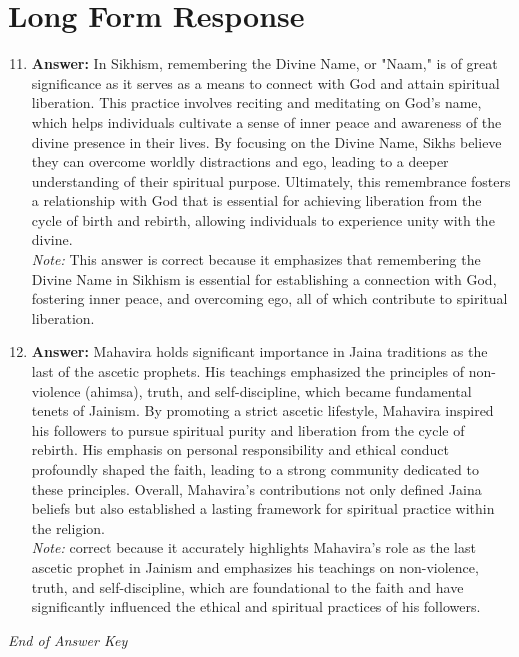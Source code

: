 \documentclass[12pt]{article}
\begin{document}
\section*{Long Form Response}
\begin{enumerate}[label=\arabic*.]
\setcounter{enumi}{10}
\item \textbf{Answer:} In Sikhism, remembering the Divine Name, or "Naam," is of great significance as it serves as a means to connect with God and attain spiritual liberation. This practice involves reciting and meditating on God's name, which helps individuals cultivate a sense of inner peace and awareness of the divine presence in their lives. By focusing on the Divine Name, Sikhs believe they can overcome worldly distractions and ego, leading to a deeper understanding of their spiritual purpose. Ultimately, this remembrance fosters a relationship with God that is essential for achieving liberation from the cycle of birth and rebirth, allowing individuals to experience unity with the divine.
\\ \textit{Note:} This answer is correct because it emphasizes that remembering the Divine Name in Sikhism is essential for establishing a connection with God, fostering inner peace, and overcoming ego, all of which contribute to spiritual liberation.
\item \textbf{Answer:} Mahavira holds significant importance in Jaina traditions as the last of the ascetic prophets. His teachings emphasized the principles of non-violence (ahimsa), truth, and self-discipline, which became fundamental tenets of Jainism. By promoting a strict ascetic lifestyle, Mahavira inspired his followers to pursue spiritual purity and liberation from the cycle of rebirth. His emphasis on personal responsibility and ethical conduct profoundly shaped the faith, leading to a strong community dedicated to these principles. Overall, Mahavira's contributions not only defined Jaina beliefs but also established a lasting framework for spiritual practice within the religion.
\\ \textit{Note:} correct because it accurately highlights Mahavira's role as the last ascetic prophet in Jainism and emphasizes his teachings on non-violence, truth, and self-discipline, which are foundational to the faith and have significantly influenced the ethical and spiritual practices of his followers.
\end{enumerate}

\vfill
\noindent\textit{End of Answer Key}
\end{document}
